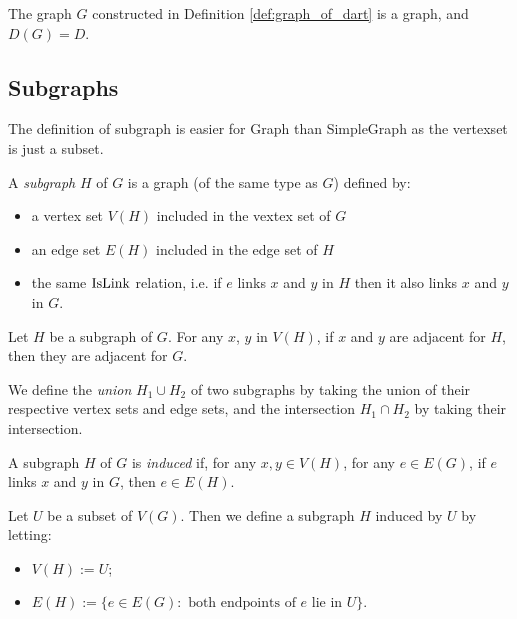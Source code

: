 \begin{theorem}
  \label{thm:dart_of_graph_of_dart}
  The graph $G$ constructed in Definition \ref{def:graph_of_dart} is a graph,
  and $D(G) = D$.
\end{theorem}

\subsection{Subgraphs}

The definition of subgraph is easier for Graph than SimpleGraph as the vertexset is just a subset.

\begin{definition}
  \label{def:subgraph}
  A \emph{subgraph} $H$ of $G$ is a graph (of the same type as $G$) defined by:
  \begin{itemize}
    \item a vertex set $V(H)$ included in the vextex set of $G$
    \item an edge set $E(H)$ included in the edge set of $H$
    \item the same $\mathrm{IsLink}$ relation, i.e. if $e$ links $x$ and $y$ in $H$ then it
    also links $x$ and $y$ in $G$.
  \end{itemize}
\end{definition}

\begin{lemma}
  \label{lem:subgraph_adj_graph}
  Let $H$ be a subgraph of $G$.
  For any $x$, $y$ in $V(H)$, if $x$ and $y$ are adjacent for $H$, then they are
  adjacent for $G$.
\end{lemma}

\begin{definition}
  \label{def:max_subgraph,def:min_subgraph}
  We define the \emph{union} $H_1 \cup H_2$ of two subgraphs by taking the union of
  their respective vertex sets and edge sets,
  and the intersection $H_1 \cap H_2$ by taking their intersection.
\end{definition}

\begin{definition}
  \label{def:isinduced}
  A subgraph $H$ of $G$ is \emph{induced} if, for any $x, y \in V(H)$, for any $e \in E(G)$,
  if $e$ links $x$ and $y$ in $G$, then $e \in E(H)$.
\end{definition}

\begin{definition}
  \label{def:induced_subgraph}
  Let $U$ be a subset of $V(G)$. Then we define a subgraph $H$ induced by $U$ by letting:
  \begin{itemize}
    \item $V(H) := U$;
    \item $E(H) := \{ e \in E(G) : \text{ both endpoints of }e \text{ lie in } U\}$.
  \end{itemize}
\end{definition}

